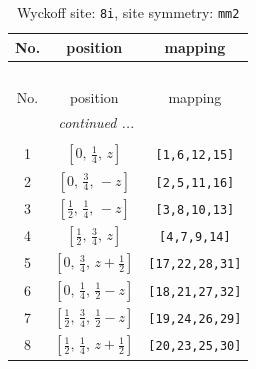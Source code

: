 \documentclass[fleqn,8pt]{jsarticle}
\begin{document}
\begin{longtable}{ccc}
\caption{Wyckoff site: {\tt 8i}, site symmetry: {\tt mm2}}
 \\
 \hline \hline
No. & position & mapping \\ \hline \endfirsthead

\multicolumn{2}{l}{\tablename\ \thetable{}} \\
 \hline \hline
No. & position & mapping \\ \hline \endhead

 \hline \hline
\multicolumn{2}{r}{\footnotesize\it continued ...} \\ \endfoot

 \hline \hline
\multicolumn{2}{r}{} \\ \endlastfoot

1 & $\left[ 0,\, \frac{1}{4},\, z \right]$ & {\tt [1,6,12,15]} \\ \hline
2 & $\left[ 0,\, \frac{3}{4},\, - z \right]$ & {\tt [2,5,11,16]} \\ \hline
3 & $\left[ \frac{1}{2},\, \frac{1}{4},\, - z \right]$ & {\tt [3,8,10,13]} \\ \hline
4 & $\left[ \frac{1}{2},\, \frac{3}{4},\, z \right]$ & {\tt [4,7,9,14]} \\ \hline
5 & $\left[ 0,\, \frac{3}{4},\, z + \frac{1}{2} \right]$ & {\tt [17,22,28,31]} \\ \hline
6 & $\left[ 0,\, \frac{1}{4},\, \frac{1}{2} - z \right]$ & {\tt [18,21,27,32]} \\ \hline
7 & $\left[ \frac{1}{2},\, \frac{3}{4},\, \frac{1}{2} - z \right]$ & {\tt [19,24,26,29]} \\ \hline
8 & $\left[ \frac{1}{2},\, \frac{1}{4},\, z + \frac{1}{2} \right]$ & {\tt [20,23,25,30]} \\
\end{longtable}
\renewcommand{\arraystretch}{1.2}
\end{document}
